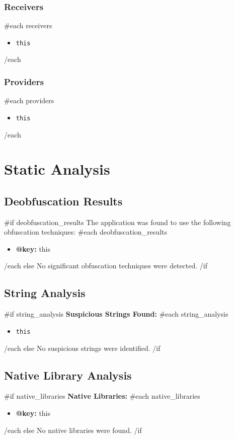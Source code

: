\documentclass[11pt,a4paper]{article}
\begin{document}
\subsubsection{Receivers}
{{#each receivers}}
\begin{itemize}
    \item \texttt{{{this}}}
\end{itemize}
{{/each}}

\subsubsection{Providers}
{{#each providers}}
\begin{itemize}
    \item \texttt{{{this}}}
\end{itemize}
{{/each}}

\section{Static Analysis}

\subsection{Deobfuscation Results}
{{#if deobfuscation_results}}
The application was found to use the following obfuscation techniques:
{{#each deobfuscation_results}}
\begin{itemize}
    \item \textbf{{{@key}}:} {{this}}
\end{itemize}
{{/each}}
{{else}}
No significant obfuscation techniques were detected.
{{/if}}

\subsection{String Analysis}
{{#if string_analysis}}
\textbf{Suspicious Strings Found:}
{{#each string_analysis}}
\begin{itemize}
    \item \texttt{{{this}}}
\end{itemize}
{{/each}}
{{else}}
No suspicious strings were identified.
{{/if}}

\subsection{Native Library Analysis}
{{#if native_libraries}}
\textbf{Native Libraries:}
{{#each native_libraries}}
\begin{itemize}
    \item \textbf{{{@key}}:} {{this}}
\end{itemize}
{{/each}}
{{else}}
No native libraries were found.
{{/if}}
\end{document}
